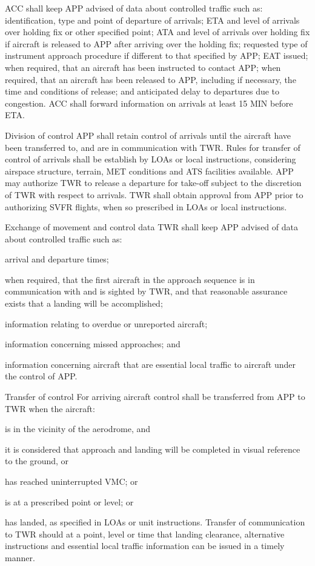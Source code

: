 ACC shall keep APP advised of data about controlled traffic such as:
identification, type and point of departure of arrivals;
ETA and level of arrivals over holding fix or other specified point;
ATA and level of arrivals over holding fix if aircraft is released to APP after arriving over the holding fix;
requested type of instrument approach procedure if different to that specified by APP;
EAT issued;
when required, that an aircraft has been instructed to contact APP;
when required, that an aircraft has been released to APP, including if necessary, the time and conditions of release; and
anticipated delay to departures due to congestion.
ACC shall forward information on arrivals at least 15 MIN before ETA. \cite[Chapter 10.1.3.3]{doc4444}

Division of control
APP shall retain control of arrivals until the aircraft have been transferred to, and are in communication with TWR. Rules for transfer of control of arrivals shall be establish by LOAs or local instructions, considering airspace structure, terrain, MET conditions and ATS facilities available.
APP may authorize TWR to release a departure for take-off subject to the discretion of TWR with respect to arrivals.
TWR shall obtain approval from APP prior to authorizing SVFR flights, when so prescribed in LOAs or local instructions. \cite[Chapter 10.1.4.1]{doc4444}

Exchange of movement and control data
TWR shall keep APP advised of data about controlled traffic such as:
\bitem
\item arrival and departure times;
\item when required, that the first aircraft in the approach sequence is in  	communication with and is sighted by TWR, and that reasonable 	assurance exists that a landing will be accomplished;
\item information relating to overdue or unreported aircraft;
\item information concerning missed approaches; and
\item information concerning aircraft that are essential local traffic to aircraft 	under the control of APP.
\eitem
\cite[Chapter 10.1.4.2]{doc4444}

Transfer of control
For arriving aircraft control shall be transferred from APP to TWR when the aircraft:
\bitem
\item is in the vicinity of the aerodrome, and
	\bitem
	\item it is considered that approach and landing will be completed in visual reference to the ground, or
	\item has reached uninterrupted VMC; or
	\eitem
\item is at a prescribed point or level; or
\item has landed, 
	as specified in LOAs or unit instructions.
\eitem
Transfer of communication to TWR should at a point, level or time that landing clearance, alternative instructions and essential local traffic information can be issued in a timely manner.

